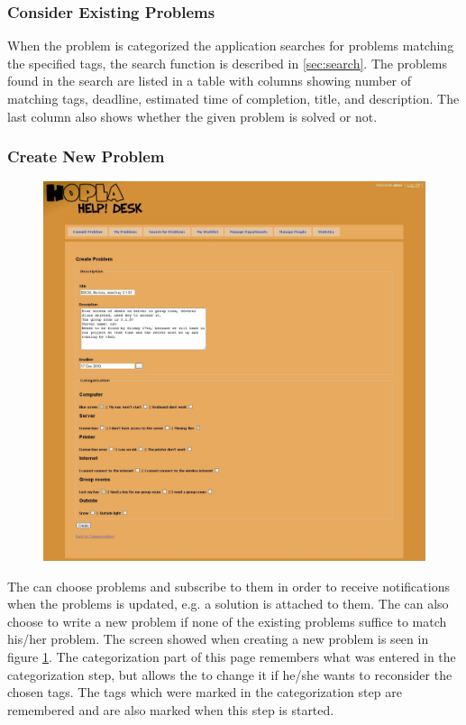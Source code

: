 \subsubsection{Consider Existing Problems}
\label{ssu:consider}
When the problem is categorized the application searches for problems matching the specified tags, the search function is described in \ref{sec:search}.
The problems found in the search are listed in a table with columns showing number of matching tags, deadline, estimated time of completion, title, and description.
The last column also shows whether the given problem is solved or not.

\subsubsection{Create New Problem}
\begin{figure}[H]
	\centering
		\includegraphics[width=1.00\textwidth, clip=true, trim=2.9cm 0.5cm 15cm 8cm]{input/implementation/program_presentation/newProblem.png}
	\label{fig:newProblem}
\end{figure}
The \aclient[] can choose problems and subscribe to them in order to receive notifications when the problems is updated, e.g. a solution is attached to them.
The \aclient[] can also choose to write a new problem if none of the existing problems suffice to match his/her problem.
The screen showed when creating a new problem is seen in figure \ref{fig:newProblem}.
The categorization part of this page remembers what was entered in the categorization step, but allows the \aclient[] to change it if he/she wants to reconsider the chosen tags.
The tags which were marked in the categorization step are remembered and are also marked when this step is started.

